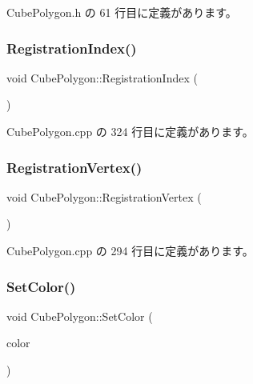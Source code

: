  Cube\+Polygon.\+h の 61 行目に定義があります。

\mbox{\label{class_cube_polygon_a5a935712a3e3c1e12552aeedf2f409c1}} 
\subsubsection{\texorpdfstring{Registration\+Index()}{RegistrationIndex()}}
{\footnotesize\ttfamily void Cube\+Polygon\+::\+Registration\+Index (\begin{DoxyParamCaption}{ }\end{DoxyParamCaption})\hspace{0.3cm}{\ttfamily [private]}}



 Cube\+Polygon.\+cpp の 324 行目に定義があります。

\mbox{\label{class_cube_polygon_adde345ed591e3e81abcffdcac5068f98}} 
\subsubsection{\texorpdfstring{Registration\+Vertex()}{RegistrationVertex()}}
{\footnotesize\ttfamily void Cube\+Polygon\+::\+Registration\+Vertex (\begin{DoxyParamCaption}{ }\end{DoxyParamCaption})\hspace{0.3cm}{\ttfamily [private]}}



 Cube\+Polygon.\+cpp の 294 行目に定義があります。

\mbox{\label{class_cube_polygon_acf6a30c30c22dd887ed570db6cbe285d}} 
\subsubsection{\texorpdfstring{Set\+Color()}{SetColor()}}
{\footnotesize\ttfamily void Cube\+Polygon\+::\+Set\+Color (\begin{DoxyParamCaption}\item[{\mbox{\hyperlink{_vector3_d_8h_a680c30c4a07d86fe763c7e01169cd6cc}{X\+Color4}}}]{color }\end{DoxyParamCaption})}



